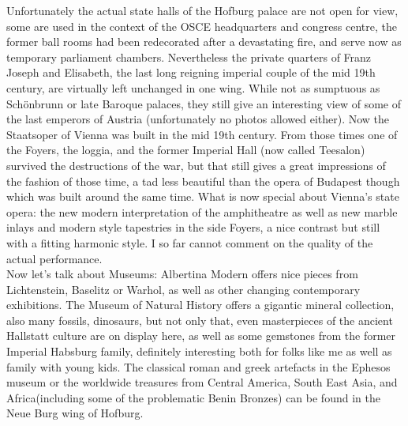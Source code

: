 Unfortunately the actual state halls of the Hofburg palace are not open for view, some are used in the context of the OSCE headquarters and congress centre, the former ball rooms had been redecorated after a devastating fire, and serve now as temporary parliament chambers. Nevertheless the private quarters of Franz Joseph and Elisabeth, the last long reigning imperial couple of the mid 19th century, are virtually left unchanged in one wing. While not as sumptuous as Sch\"onbrunn or late Baroque palaces, they still give an interesting view of some of the last emperors of Austria (unfortunately no photos allowed either). Now the Staatsoper of Vienna was built in the mid 19th century. From those times one of the Foyers, the loggia, and the former Imperial Hall (now called Teesalon) survived the destructions of the war, but that still gives a great impressions of the fashion of those time, a tad less beautiful than the opera of Budapest though which was built around the same time. What is now special about Vienna's state opera: the new modern interpretation of the amphitheatre as well as new marble inlays and modern style tapestries in the side Foyers, a nice contrast but still with a fitting harmonic style. I so far cannot comment on the quality of the actual performance.\\
Now let's talk about Museums: Albertina Modern offers nice pieces from Lichtenstein, Baselitz or Warhol, as well as other  changing contemporary exhibitions. The Museum of Natural History offers a gigantic mineral collection, also many fossils, dinosaurs, but not only that, even masterpieces of the ancient Hallstatt culture are on display here, as well as some gemstones from the former Imperial Habsburg family, definitely interesting both for folks like me as well as family with young kids. The classical roman and greek artefacts in the Ephesos museum or the worldwide treasures from Central America, South East Asia, and Africa(including some of the problematic Benin Bronzes) can be found in the Neue Burg wing of Hofburg. \\


